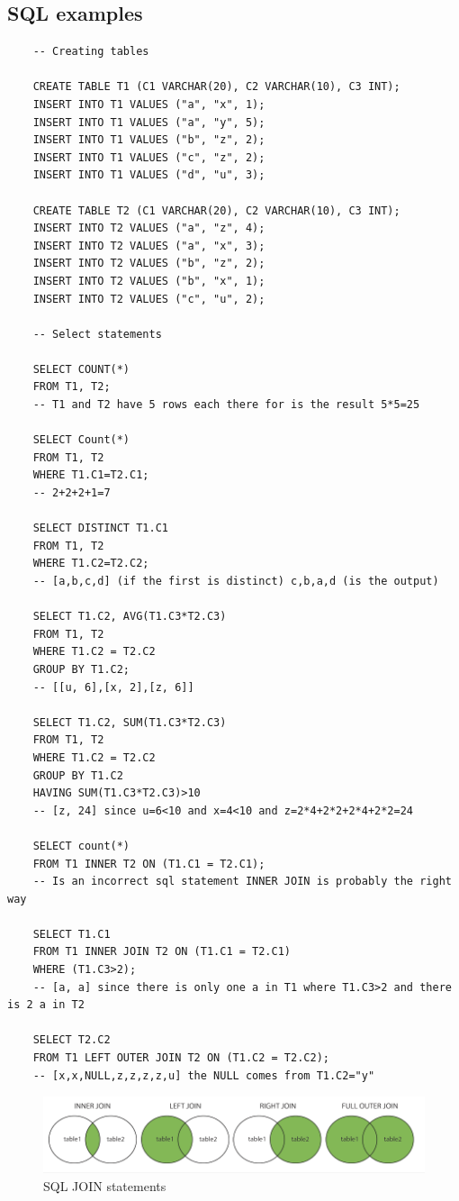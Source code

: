 \subsection{SQL examples}
\begin{verbatim}
    -- Creating tables

    CREATE TABLE T1 (C1 VARCHAR(20), C2 VARCHAR(10), C3 INT);
    INSERT INTO T1 VALUES ("a", "x", 1);
    INSERT INTO T1 VALUES ("a", "y", 5);
    INSERT INTO T1 VALUES ("b", "z", 2);
    INSERT INTO T1 VALUES ("c", "z", 2);
    INSERT INTO T1 VALUES ("d", "u", 3);

    CREATE TABLE T2 (C1 VARCHAR(20), C2 VARCHAR(10), C3 INT);
    INSERT INTO T2 VALUES ("a", "z", 4);
    INSERT INTO T2 VALUES ("a", "x", 3);
    INSERT INTO T2 VALUES ("b", "z", 2);
    INSERT INTO T2 VALUES ("b", "x", 1);
    INSERT INTO T2 VALUES ("c", "u", 2);

    -- Select statements
    
    SELECT COUNT(*)
    FROM T1, T2; 
    -- T1 and T2 have 5 rows each there for is the result 5*5=25

    SELECT Count(*)
    FROM T1, T2
    WHERE T1.C1=T2.C1; 
    -- 2+2+2+1=7

    SELECT DISTINCT T1.C1
    FROM T1, T2
    WHERE T1.C2=T2.C2;
    -- [a,b,c,d] (if the first is distinct) c,b,a,d (is the output)

    SELECT T1.C2, AVG(T1.C3*T2.C3)
    FROM T1, T2
    WHERE T1.C2 = T2.C2
    GROUP BY T1.C2;
    -- [[u, 6],[x, 2],[z, 6]]

    SELECT T1.C2, SUM(T1.C3*T2.C3)
    FROM T1, T2
    WHERE T1.C2 = T2.C2
    GROUP BY T1.C2
    HAVING SUM(T1.C3*T2.C3)>10  
    -- [z, 24] since u=6<10 and x=4<10 and z=2*4+2*2+2*4+2*2=24 

    SELECT count(*)
    FROM T1 INNER T2 ON (T1.C1 = T2.C1);  
    -- Is an incorrect sql statement INNER JOIN is probably the right way

    SELECT T1.C1
    FROM T1 INNER JOIN T2 ON (T1.C1 = T2.C1)
    WHERE (T1.C3>2);
    -- [a, a] since there is only one a in T1 where T1.C3>2 and there is 2 a in T2

    SELECT T2.C2
    FROM T1 LEFT OUTER JOIN T2 ON (T1.C2 = T2.C2);
    -- [x,x,NULL,z,z,z,z,u] the NULL comes from T1.C2="y"

\end{verbatim}
\begin{figure}[!h]
    \centering
    \includegraphics[width=12cm]{image/sql_joins.png}
    \caption{SQL JOIN statements}
    \label{fig:sql_joins}
\end{figure}


